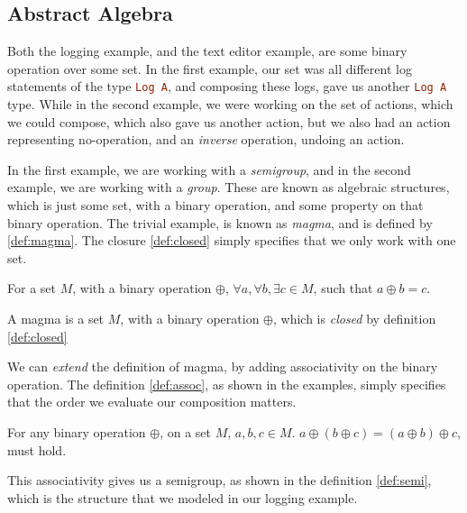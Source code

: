 \subsection{Abstract Algebra}

Both the logging example, and the text editor example, are some binary
operation over some set. In the first example, our set was all different log
statements of the type \lstinline[language=Haskell]{Log A}, and composing these
logs, gave us another \lstinline[language=Haskell]{Log A} type. While in the
second example, we were working on the set of actions, which we could compose,
which also gave us another action, but we also had an action representing
no-operation, and an \textit{inverse} operation, undoing an action.

In the first example, we are working with a \textit{semigroup}, and in the
second example, we are working with a \textit{group}. These are known as
algebraic structures, which is just some set, with a binary operation, and some
property on that binary operation. The trivial example, is known as
\textit{magma}, and is defined by \ref{def:magma}. The closure \ref{def:closed}
simply specifies that we only work with one set.

\begin{definition}[Closure] \label{def:closed}
  For a set $M$, with a binary operation $\oplus$,
  $\forall a, \forall b, \exists c \in M$, such that
  $a \oplus b = c$.
\end{definition}

\begin{definition}[Magma] \label{def:magma}
  A magma is a set $M$, with a binary operation $\oplus$, which is
  \textit{closed} by definition \ref{def:closed}
\end{definition}

We can \textit{extend} the definition of magma, by adding associativity on the
binary operation. The definition \ref{def:assoc}, as shown in the examples,
simply specifies that the order we evaluate our composition matters.

\begin{definition} \label{def:assoc}
  For any binary operation $\oplus$, on a set $M$, $a, b, c \in M$.
  $a \oplus \left ( b \oplus c \right ) = \left ( a \oplus b \right ) \oplus c$,
  must hold.
\end{definition}

This associativity gives us a semigroup, as shown in the definition
\ref{def:semi}, which is the structure that we modeled in our logging example.

